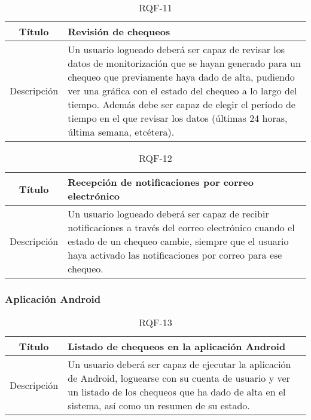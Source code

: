 \begin{table}[h!]
  \centering
  \begin{tabularx}{\textwidth}{|c|X|}
    \hline
    Título & Revisión de chequeos \\

    \hline

    Descripción & Un usuario logueado deberá ser capaz de revisar los datos de
    monitorización que se hayan generado para un chequeo que previamente haya
    dado de alta, pudiendo ver una gráfica con el estado del chequeo a lo largo
    del tiempo. Además debe ser capaz de elegir el período de tiempo en el que
    revisar los datos (últimas 24 horas, última semana, etcétera). \\

    \hline
  \end{tabularx}
  \caption{RQF-11}
\end{table}


\begin{table}[h!]
  \centering
  \begin{tabularx}{\textwidth}{|c|X|}
    \hline
    Título & Recepción de notificaciones por correo electrónico \\

    \hline

    Descripción & Un usuario logueado deberá ser capaz de recibir notificaciones
    a través del correo electrónico cuando el estado de un chequeo cambie,
    siempre que el usuario haya activado las notificaciones por correo para ese
    chequeo. \\

    \hline
  \end{tabularx}
  \caption{RQF-12}
\end{table}

\FloatBarrier
\subsubsection{Aplicación Android}


\begin{table}[h!]
  \centering
  \begin{tabularx}{\textwidth}{|c|X|}
    \hline
    Título & Listado de chequeos en la aplicación Android \\

    \hline

    Descripción & Un usuario deberá ser capaz de ejecutar la aplicación de
    Android, loguearse con su cuenta de usuario y ver un listado de los chequeos
    que ha dado de alta en el sistema, así como un resumen de su estado.
    \\

    \hline
  \end{tabularx}
  \caption{RQF-13}
\end{table}


